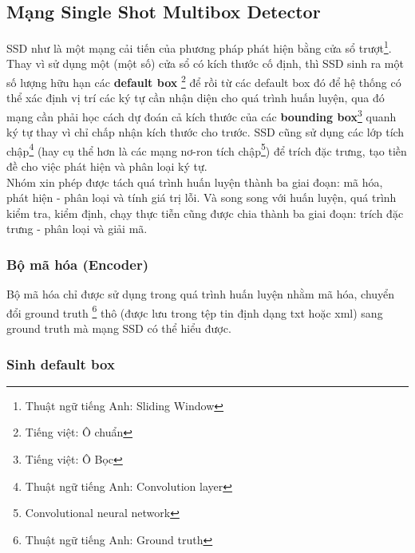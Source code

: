 \documentclass[a4paper,12pt]{article}
\begin{document}
	\subsection{Mạng Single Shot Multibox Detector\cite{liu2016ssd}}
	SSD\cite{liu2016ssd} như là một mạng cải tiến của phương pháp phát hiện bằng cửa sổ trượt\footnote{Thuật ngữ tiếng Anh: Sliding Window}. Thay vì sử dụng một (một số) cửa sổ có kích thước cố định, thì SSD sinh ra một số lượng hữu hạn các \textbf{default box} \footnote{Tiếng việt: Ô chuẩn} để rồi từ các default box đó để hệ thống có thể xác định vị trí các ký tự cần nhận diện cho quá trình huấn luyện, qua đó mạng cần phải học cách dự đoán cả kích thước của các \textbf{bounding box}\footnote{Tiếng việt: Ô Bọc} quanh ký tự thay vì chỉ chấp nhận kích thước cho trước. SSD\cite{liu2016ssd} cũng sử dụng các lớp tích chập\footnote{Thuật ngữ tiếng Anh: Convolution layer} (hay cụ thể hơn là các mạng nơ-ron tích chập\footnote{Convolutional neural network}) để trích đặc trưng, tạo tiền đề cho việc phát hiện và phân loại ký tự. \\
	Nhóm xin phép được tách quá trình huấn luyện thành ba giai đoạn: mã hóa, phát hiện - phân loại và tính giá trị lỗi. Và song song với huấn luyện, quá trình kiểm tra, kiểm định, chạy thực tiễn cũng được chia thành ba giai đoạn: trích đặc trưng - phân loại và giải mã.
	
	\subsubsection{Bộ mã hóa (Encoder)}
	Bộ mã hóa chỉ được sử dụng trong quá trình huấn luyện nhằm mã hóa, chuyển đổi ground truth \footnote{Thuật ngữ tiếng Anh: Ground truth} thô (được lưu trong tệp tin định dạng txt hoặc xml) sang ground truth mà mạng SSD\cite{liu2016ssd} có thể hiểu được.
	
	\subsubsection*{Sinh default box}
	
\end{document}
